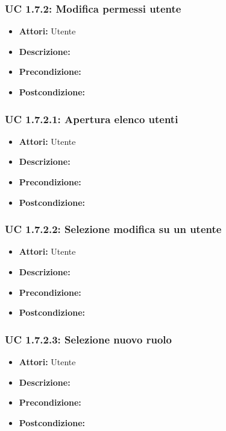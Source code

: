 \subsubsection{UC 1.7.2: Modifica permessi utente}

\begin{itemize}
\item \textbf{Attori:} Utente
\item \textbf{Descrizione:} 
\item \textbf{Precondizione:} 
\item \textbf{Postcondizione:} 
\end{itemize}

\subsubsection{UC 1.7.2.1: Apertura elenco utenti}

\begin{itemize}
\item \textbf{Attori:} Utente
\item \textbf{Descrizione:} 
\item \textbf{Precondizione:} 
\item \textbf{Postcondizione:} 
\end{itemize}

\subsubsection{UC 1.7.2.2: Selezione modifica su un utente}

\begin{itemize}
\item \textbf{Attori:} Utente
\item \textbf{Descrizione:} 
\item \textbf{Precondizione:} 
\item \textbf{Postcondizione:} 
\end{itemize}

\subsubsection{UC 1.7.2.3: Selezione nuovo ruolo}

\begin{itemize}
\item \textbf{Attori:} Utente
\item \textbf{Descrizione:} 
\item \textbf{Precondizione:} 
\item \textbf{Postcondizione:} 
\end{itemize}

